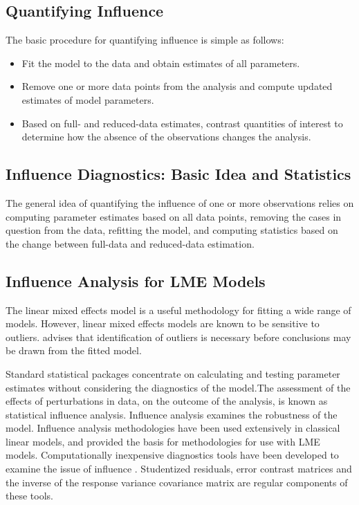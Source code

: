 \documentclass[12pt, a4paper]{article}
\begin{document}
\subsection{Quantifying Influence}  %

The basic procedure for quantifying influence is simple as follows:
\begin{itemize}
	\item Fit the model to the data and obtain estimates of all parameters.
	\item Remove one or more data points from the analysis and compute updated estimates of model parameters.
	\item Based on full- and reduced-data estimates, contrast quantities of interest to determine how the absence
	of the observations changes the analysis.
\end{itemize}

\subsection{Influence Diagnostics: Basic Idea and Statistics} %

The general idea of quantifying the influence of one or more observations relies on computing parameter estimates based on all data points, removing the cases in question from the data, refitting the model, and computing statistics based on the change between full-data and reduced-data estimation. 



\subsection{Influence Analysis for LME Models} %
The linear mixed effects model is a useful methodology for fitting a wide range of models. However, linear mixed effects models are known to be sensitive to outliers. \citet{CPJ} advises that identification of outliers is necessary before conclusions may be drawn from the fitted model.

Standard statistical packages concentrate on calculating and testing parameter estimates without considering the diagnostics of the model.The assessment of the effects of perturbations in data, on the outcome of the analysis, is known as statistical influence analysis. Influence analysis examines the robustness of the model. Influence analysis methodologies have been used extensively in classical linear models, and provided the basis for methodologies for use with LME models.
Computationally inexpensive diagnostics tools have been developed to examine the issue of influence \citep{Zewotir}.
Studentized residuals, error contrast matrices and the inverse of the response variance covariance matrix are regular components of these tools.
\end{document}

